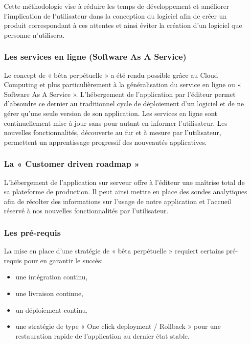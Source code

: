 \documentclass{report}
\begin{document}
        Cette méthodologie vise à réduire les temps de développement et améliorer l’implication de l’utilisateur dans la conception du logiciel afin de créer un produit correspondant à ces attentes et ainsi éviter la création d’un logiciel que personne n’utilisera.

        \subsubsection{Les services en ligne (Software As A Service)}
        Le concept de « bêta perpétuelle » a été rendu possible grâce au Cloud Computing et plus particulièrement à la généralisation du service en ligne ou « Software As A Service ». L’hébergement de l’application par l’éditeur permet d’absoudre ce dernier au traditionnel cycle de déploiement d’un logiciel et de ne gérer qu’une seule version de son application. Les services en ligne sont continuellement mise à jour sans pour autant en informer l’utilisateur. Les nouvelles fonctionnalités, découverte au fur et à mesure par l’utilisateur, permettent un apprentissage progressif des nouveautés applicatives.

        \subsubsection{La « Customer driven roadmap »}
        L’hébergement de l’application sur serveur offre à l’éditeur une maîtrise total de sa plateforme de production. Il peut ainsi mettre en place des sondes analytiques afin de récolter des informations sur l’usage de notre application et l’accueil réservé à nos nouvelles fonctionnalités par l’utilisateur.

        \subsubsection{Les pré-requis}
        La mise en place d’une stratégie de « bêta perpétuelle » requiert certains pré-requis pour en garantir le succès:\\
        \begin{itemize}
          \item une intégration continu,
          \item une livraison continue,
          \item un déploiement continu,
          \item une stratégie de type « One click deployment / Rollback » pour une restauration rapide de l’application au dernier état stable.\\
        \end{itemize}
\end{document}
